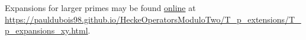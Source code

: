 Expansions for larger primes may be found \href{https://pauldubois98.github.io/HeckeOperatorsModuloTwo/T_p_extensions/T_p_expansions_xy.html}{online} at \url{https://pauldubois98.github.io/HeckeOperatorsModuloTwo/T_p_extensions/T_p_expansions_xy.html}.


